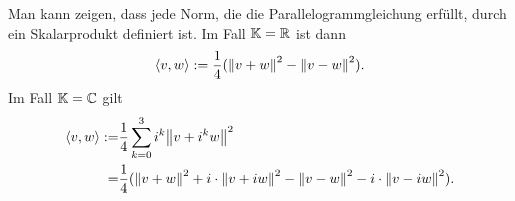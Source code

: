 \begin{bemerkung}
	\label{bem:3.9}
	Man kann zeigen, dass jede Norm, die die Parallelogrammgleichung erfüllt, durch ein Skalarprodukt definiert ist.
	Im Fall $\mathbb{K} = \mathbb{R}$ ist dann
	\[
		\left\langle v,w\right\rangle := \frac{1}{4} (\left\lVert v+w\right\rVert^2 - \left\lVert v-w\right\rVert^2).
	\]
	Im Fall $\mathbb{K}= \mathbb{C}$ gilt
	\begin{align*}
		\sk{v,w} := &\frac{1}{4} \sum_{k=0}^{3} i^k \no{v+i^kw}^2 \\
		= &\frac{1}{4} (\no{v+w}^2 + i \cdot \no{v+iw}^2 - \no{v-w}^2 - i \cdot \no{v-iw}^2).
	\end{align*}
\end{bemerkung}